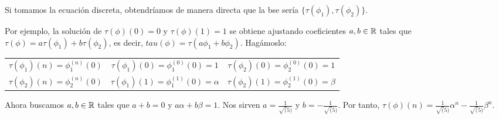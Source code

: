 \begin{ejemplo}
  Si tomamos la ecuación discreta, obtendríamos de manera directa que la bse sería
  \(\{\tau(\phi_1), \tau(\phi_2)\}\).

  Por ejemplo, la solución de \(\tau(\phi)(0) = 0\) y \(\tau(\phi)(1) = 1\) se obtiene
  ajustando coeficientes \(a, b \in \mathbb{R}\) tales que \(\tau(\phi) = a\tau(\phi_1) +
  b \tau(\phi_2)\), es decir, \(tau(\phi) = \tau(a\phi_1 + b\phi_2)\). Hagámoslo:
  \begin{center}
    \begin{tabular}{c c c}
      \(\tau(\phi_1)(n) = \phi_1^{(n)}(0)\) & \(\tau(\phi_1)(0) = \phi_1^{(0)}(0) = 1\) & \(\tau(\phi_2)(0) = \phi_2^{(0)}(0) = 1\) \\
      \(\tau(\phi_2)(n) = \phi_2^{(n)}(0)\) & \(\tau(\phi_1)(1) = \phi_1^{(1)}(0) = \alpha\) & \(\tau(\phi_2)(1) = \phi_2^{(1)}(0) = \beta\) \\
    \end{tabular}
  \end{center}

  Ahora buscamos \(a, b \in \mathbb{R}\) tales que \(a + b = 0\) y \(a\alpha + b\beta = 1\).
  Nos sirven \(a = \frac{1}{\sqrt(5)}\) y \(b = -\frac{1}{\sqrt(5)}\).
  Por tanto, \(\tau(\phi)(n) = \frac{1}{\sqrt(5)}\alpha^n - \frac{1}{\sqrt(5)}\beta^n\).
\end{ejemplo}

  